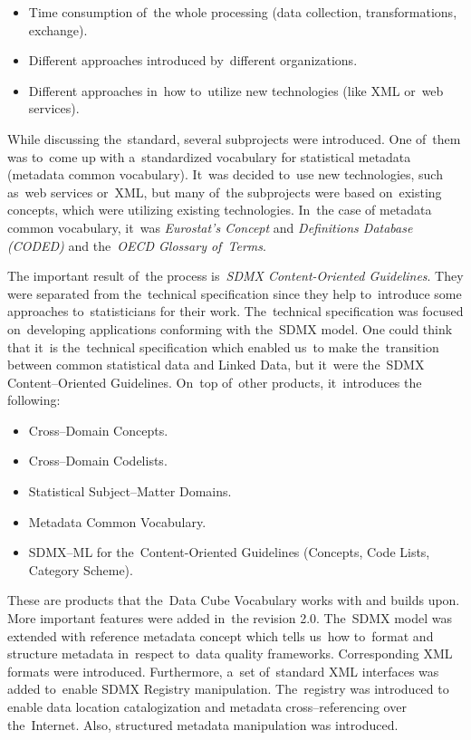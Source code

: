 \begin{itemize}
\item Time consumption of~the whole processing (data collection, transformations, 
exchange).
\item Different approaches introduced by~different organizations.
\item Different approaches in~how to~utilize new technologies (like XML or~web 
services).
\end{itemize}

While discussing the~standard, several subprojects were introduced. One of~them was to~come
up with a~standardized vocabulary for statistical metadata (metadata common vocabulary). It~was
decided to~use new technologies, such as~web services or~XML, but many of~the subprojects
were based on~existing concepts, which were utilizing existing technologies. In~the case of
metadata common vocabulary, it~was \emph{Eurostat’s Concept} and
\emph{Definitions Database (CODED)} and the~\emph{OECD Glossary of~Terms}.

The important result of~the process is~\emph{SDMX Content-Oriented Guidelines}.
They were separated
from the~technical specification since they help to~introduce some approaches to~statisticians
for their work. The~technical specification was focused on~developing applications
conforming with the~SDMX model. One could think that it~is the~technical specification
which enabled us~to make the~transition between common statistical data and Linked Data,
but it~were the~SDMX Content--Oriented Guidelines. On~top of~other products, it~introduces the
following:

\begin{itemize}
\item Cross--Domain Concepts.
\item Cross--Domain Codelists.
\item Statistical Subject--Matter Domains.
\item Metadata Common Vocabulary.
\item SDMX--ML for the~Content-Oriented Guidelines (Concepts, Code Lists, Category 
Scheme).
\end{itemize}

These are products that the~Data Cube Vocabulary works with and builds upon. More important
features were added in~the revision 2.0. The~SDMX model was extended with reference metadata
concept which tells us~how to~format and structure metadata in~respect to~data quality
frameworks. Corresponding XML formats were introduced. Furthermore, a~set of~standard XML
interfaces was added to~enable SDMX Registry manipulation. The~registry was introduced to
enable data location catalogization and metadata cross--referencing over the~Internet. Also,
structured metadata manipulation was introduced.

